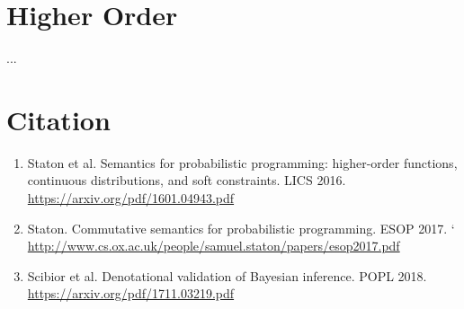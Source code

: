 \documentclass[11pt]{article}
\theoremstyle{definition}
\theoremstyle{plain}
\begin{document}
\section{Higher Order}

\noindent ...

\section{Citation}

\begin{enumerate}
  \item Staton et al. Semantics for probabilistic programming: higher-order
        functions, continuous distributions, and soft constraints. LICS 2016.
        \url{https://arxiv.org/pdf/1601.04943.pdf}

  \item Staton. Commutative semantics for probabilistic programming. ESOP 2017.
`        \url{http://www.cs.ox.ac.uk/people/samuel.staton/papers/esop2017.pdf}

  \item Scibior et al. Denotational validation of Bayesian inference. POPL 2018.
        \url{https://arxiv.org/pdf/1711.03219.pdf}

\end{enumerate}

\end{document}
